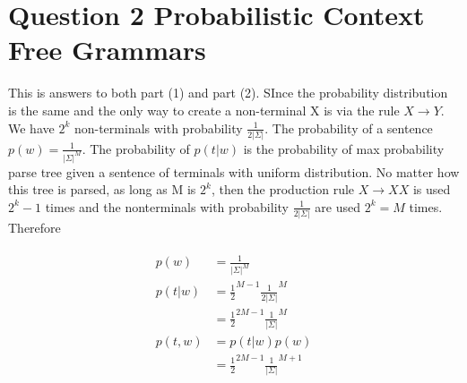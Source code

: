 \documentclass[11pt]{article}
\begin{document}
\section*{Question 2 Probabilistic Context Free Grammars}

This is answers to both part (1) and part (2). SInce the probability distribution is the same and the only way to create a non-terminal X is via the rule $X \rightarrow Y$.  We have $2^k$ non-terminals with probability $\frac{1}{2|\Sigma|}$.
The probability of a sentence $p(w)=\frac{1}{|\Sigma|^M}$. The probability of $p(t|w)$ is the probability of max probability parse tree given a sentence of terminals with uniform distribution. No matter how this tree is parsed, as long as M is $2^k$,
then the production rule $X \rightarrow X X$ is used $2^k-1$ times and the nonterminals with probability $\frac{1}{2|\Sigma|}$ are used $2^k=M$ times. Therefore

\begin{align}
	\begin{split}
		p(w) &= \frac{1}{|\Sigma|^M} \\
		p(t|w) &= \frac{1}{2}^{M-1}\frac{1}{2|\Sigma|}^M \\
			&= \frac{1}{2}^{2M-1}\frac{1}{|\Sigma|}^M  \\
		p(t,w) &= p(t|w)p(w) \\
			&= \frac{1}{2}^{2M-1}\frac{1}{|\Sigma|}^{M+1}
	\end{split}
\end{align} 




\end{document}
